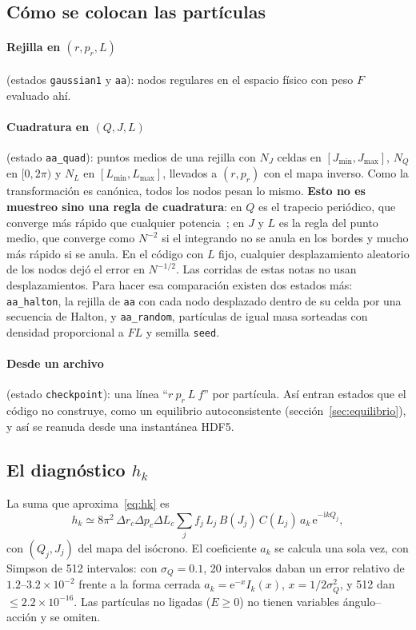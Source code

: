 \documentclass[11pt,a4paper]{article}
\newcommand{\ee}{\mathrm{e}}
\newcommand{\ii}{\mathrm{i}}
\begin{document}
\subsection{Cómo se colocan las partículas}
\label{sec:muestreo}

\paragraph{Rejilla en $(r,p_r,L)$} (estados \texttt{gaussian1} y \texttt{aa}): nodos
regulares en el espacio físico con peso $F$ evaluado ahí.

\paragraph{Cuadratura en $(Q,J,L)$} (estado \texttt{aa\_quad}): puntos medios de una
rejilla con $N_J$ celdas en $[J_{\min},J_{\max}]$, $N_Q$ en $[0,2\pi)$ y $N_L$ en
$[L_{\min},L_{\max}]$, llevados a $(r,p_r)$ con el mapa inverso. Como la transformación es
canónica, todos los nodos pesan lo mismo. \textbf{Esto no es muestreo sino una regla de
cuadratura}: en $Q$ es el trapecio periódico, que converge más rápido que cualquier
potencia~\cite{trefethen2014}; en $J$ y $L$ es la regla del punto medio, que converge
como $N^{-2}$ si el integrando no se anula en los bordes y mucho más rápido si se anula.
En el código con $L$ fijo, cualquier desplazamiento aleatorio de los nodos dejó el error
en $N^{-1/2}$. Las corridas de estas notas no usan desplazamientos. Para hacer esa
comparación existen dos estados más: \texttt{aa\_halton}, la rejilla de \texttt{aa} con
cada nodo desplazado dentro de su celda por una secuencia de Halton, y
\texttt{aa\_random}, partículas de igual masa sorteadas con densidad proporcional a $FL$
y semilla \texttt{seed}.

\paragraph{Desde un archivo} (estado \texttt{checkpoint}): una línea
``$r\ p_r\ L\ f$'' por partícula. Así entran estados que el código no construye, como un
equilibrio autoconsistente (sección~\ref{sec:equilibrio}), y así se reanuda desde una
instantánea HDF5.

\subsection{\texorpdfstring{El diagnóstico $h_k$}{El diagnóstico hk}}

La suma que aproxima~\eqref{eq:hk} es
\begin{equation}
  h_k\simeq8\pi^2\,\Delta r_c\Delta p_c\Delta L_c\sum_j f_j\,L_j\,B(J_j)\,C(L_j)\,a_k\,
  \ee^{-\ii kQ_j},
\end{equation}
con $(Q_j,J_j)$ del mapa del isócrono. El coeficiente $a_k$ se calcula una sola vez, con
Simpson de 512 intervalos: con $\sigma_Q=0.1$, 20 intervalos daban un error relativo de
$1.2$--$3.2\times10^{-2}$ frente a la forma cerrada $a_k=\ee^{-x}I_k(x)$, $x=1/2\sigma_Q^2$,
y 512 dan $\leq2.2\times10^{-16}$. Las partículas no ligadas ($E\geq0$) no tienen
variables ángulo--acción y se omiten.
\end{document}
